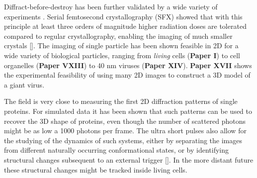 Diffract-before-destroy has been further validated by a wide variety of experiments \cite{Seibert2009,Seibert2010}. Serial femtosecond crystallography (SFX) showed that with this principle at least three orders of magnitude higher radiation doses are tolerated compared to regular crystallography, enabling the imaging of much smaller crystals []. The imaging of single particle has been shown feasible in 2D for a wide variety of biological particles, ranging from \textit{living} cells (\textbf{Paper I}) to cell organelles (\textbf{Paper VXIII}) to  40 nm viruses (\textbf{Paper XIV}). \textbf{Paper XVII} shows the experimental feasibility of using many 2D images to construct a 3D model of a giant virus.

The field is very close to measuring the first 2D diffraction patterns of single proteins. For simulated data it has been shown that such patterns can be used to recover the 3D shape of proteins, even though the number of scattered photons might be as low a 1000 photons per frame. The ultra short pulses also allow for the studying of the dynamics of such systems, either by separating the images from different naturally occurring conformational states, or by identifying structural changes subsequent to an external trigger []. In the more distant future these structural changes might be tracked inside living cells. 
 